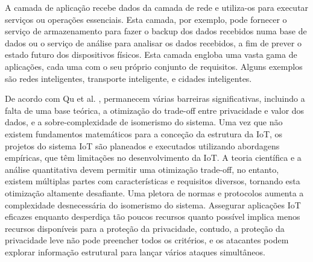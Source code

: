 \documentclass[conference]{IEEEtran}
\begin{document}

A camada de aplicação recebe dados da camada de rede e utiliza-os para
executar serviços ou operações essenciais. Esta camada, por exemplo,
pode fornecer o serviço de armazenamento para fazer o backup dos dados
recebidos numa base de dados ou o serviço de análise para analisar os
dados recebidos, a fim de prever o estado futuro dos dispositivos físicos.
Esta camada engloba uma vasta gama de aplicações, cada uma com o seu
próprio conjunto de requisitos. Alguns exemplos são redes inteligentes,
transporte inteligente, e cidades inteligentes.


De acordo com Qu et al. \cite{Qu2018Privacy}, permanecem várias barreiras
significativas, incluindo a falta de uma base teórica, a otimização do
trade-off entre privacidade e valor dos dados, e a sobre-complexidade de
isomerismo do sistema. Uma vez que não existem fundamentos matemáticos para
a conceção da estrutura da IoT, os projetos do sistema IoT são planeados
e executados utilizando abordagens empíricas, que têm limitações no desenvolvimento
da IoT. A teoria científica e a análise quantitativa devem permitir uma otimização
trade-off, no entanto, existem múltiplas partes com características e requisitos
diversos, tornando esta otimização altamente desafiante. Uma pletora de normas
e protocolos aumenta a complexidade desnecessária do isomerismo do sistema.
Assegurar aplicações IoT eficazes enquanto desperdiça tão poucos recursos
quanto possível implica menos recursos disponíveis para a proteção da
privacidade, contudo, a proteção da privacidade leve não pode preencher
todos os critérios, e os atacantes podem explorar informação estrutural
para lançar vários ataques simultâneos.
\end{document}
